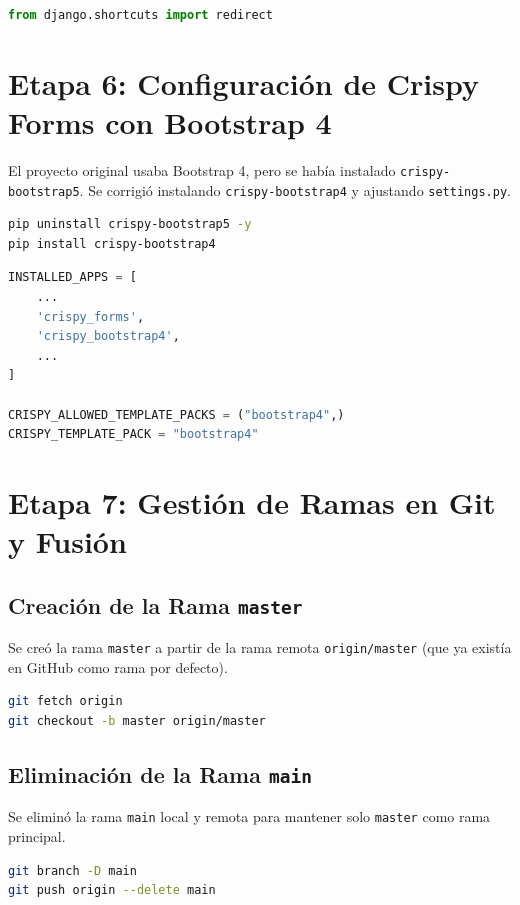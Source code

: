 \documentclass[12pt, spanish]{article}
\begin{document}
\begin{lstlisting}[language=python, caption={Importación de redirect}]
from django.shortcuts import redirect
\end{lstlisting}

\section{Etapa 6: Configuración de Crispy Forms con Bootstrap 4}
El proyecto original usaba Bootstrap 4, pero se había instalado \texttt{crispy-bootstrap5}. Se corrigió instalando \texttt{crispy-bootstrap4} y ajustando \texttt{settings.py}.

\begin{lstlisting}[language=bash, caption={Cambio a Bootstrap 4}]
pip uninstall crispy-bootstrap5 -y
pip install crispy-bootstrap4
\end{lstlisting}

\begin{lstlisting}[language=python, caption={Configuración en settings.py}]
INSTALLED_APPS = [
    ...
    'crispy_forms',
    'crispy_bootstrap4',
    ...
]

CRISPY_ALLOWED_TEMPLATE_PACKS = ("bootstrap4",)
CRISPY_TEMPLATE_PACK = "bootstrap4"
\end{lstlisting}

\section{Etapa 7: Gestión de Ramas en Git y Fusión}
\subsection{Creación de la Rama \texttt{master}}
Se creó la rama \texttt{master} a partir de la rama remota \texttt{origin/master} (que ya existía en GitHub como rama por defecto).

\begin{lstlisting}[language=bash, caption={Creación de master local}]
git fetch origin
git checkout -b master origin/master
\end{lstlisting}

\subsection{Eliminación de la Rama \texttt{main}}
Se eliminó la rama \texttt{main} local y remota para mantener solo \texttt{master} como rama principal.

\begin{lstlisting}[language=bash, caption={Eliminación de main}]
git branch -D main
git push origin --delete main
\end{lstlisting}
\end{document}
